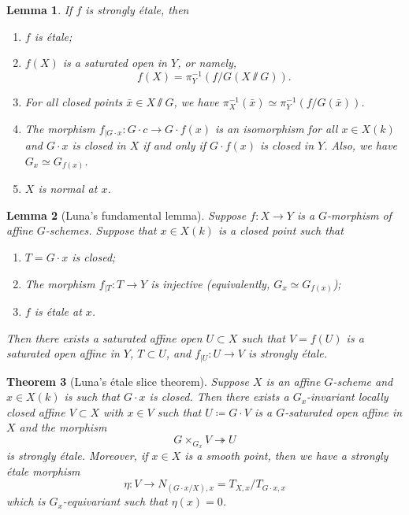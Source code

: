 \documentclass{amsart}
\newtheorem{thm}{Theorem}[section]
\newtheorem{lem}[thm]{Lemma}
\theoremstyle{definition}
\theoremstyle{remark}
\theoremstyle{plain}
\theoremstyle{definition}
\theoremstyle{remark}
\newcommand{\1}{\mathbf{1}}
\newcommand{\2}{\mathbf{2}}
\newcommand{\3}{\mathbf{3}}
\begin{document}
\begin{lem}
    If \(f\) is strongly \'etale, then
    \begin{enumerate}
        \item \(f\) is \'etale;
        \item \(f(X)\) is a saturated open in \(Y\), or namely,
        \[ f(X) = \pi_Y^{-1} (f/G (X \sslash G)). \]
        \item For all closed points \(\bar{x} \in X \sslash G\), we have \(\pi_X^{-1}(\bar{x}) \simeq \pi_Y^{-1}(f/G(\bar{x}))\).
        \item The morphism \(f_{|G \cdot x} \colon G \cdot c \to G \cdot f(x)\) is an isomorphism for all \(x \in X(k)\) and \(G \cdot x\) is closed in \(X\) if and only if \(G \cdot f(x)\) is closed in \(Y\). Also, we have \(G_x \simeq G_{f(x)}\).
        \item \(X\) is normal at \(x\).
    \end{enumerate}
\end{lem}

\begin{lem}[Luna's fundamental lemma]
    Suppose \(f \colon X \to Y\) is a \(G\)-morphism of affine \(G\)-schemes. Suppose that \(x \in X(k)\) is a closed point such that
    \begin{enumerate}
        \item \(T = G \cdot x\) is closed;
        \item The morphism \(f_{|T} \colon T \to Y\) is injective (equivalently, \(G_x \simeq G_{f(x)}\));
        \item \(f\) is \'etale at \(x\).
    \end{enumerate}
    Then there exists a saturated affine open \(U \subset X\) such that \(V = f(U)\) is a saturated open affine in \(Y\), \(T \subset U\), and \(f_{|U} \colon U \to V\) is strongly \'etale.
\end{lem}

\begin{thm}[Luna's \'etale slice theorem]
    Suppose \(X\) is an affine \(G\)-scheme and \(x \in X(k)\) is such that \(G \cdot x\) is closed. Then there exists a \(G_x\)-invariant locally closed affine \(V \subset X\) with \(x \in V\) such that \(U \coloneqq G \cdot V\) is a \(G\)-saturated open affine in \(X\) and the morphism 
    \[ G \times_{G_x} V \twoheadrightarrow U \]
    is strongly \'etale. Moreover, if \(x \in X\) is a smooth point, then we have a strongly \'etale morphism
    \[ \eta \colon V \to N_{(G \cdot x/X), x} = T_{X,x} / T_{G \cdot x, x} \]
    which is \(G_x\)-equivariant such that \(\eta(x) = 0\).
\end{thm}
\end{document}
